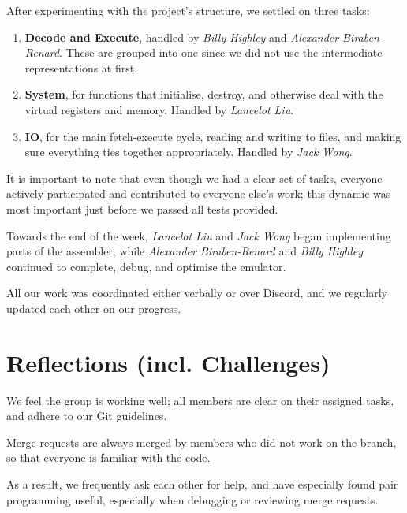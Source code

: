 \documentclass{ictex}
\begin{document}
After experimenting with the project's structure, we settled on three tasks:

\begin{enumerate}
    \item \textbf{Decode and Execute}, handled by \textit{Billy Highley} and \textit{Alexander Biraben-Renard}. These are grouped into one since we did not use the intermediate representations at first.
    \item \textbf{System}, for functions that initialise, destroy, and otherwise deal with the virtual registers and memory. Handled by \textit{Lancelot Liu}.
    \item \textbf{IO}, for the main fetch-execute cycle, reading and writing to files, and making sure everything ties together appropriately. Handled by \textit{Jack Wong}.
\end{enumerate}

\vspace{1em} \begin{formal}
    It is important to note that even though we had a clear set of tasks, everyone actively participated and contributed to everyone else's work; this dynamic was most important just before we passed all tests provided.
\end{formal}

Towards the end of the week, \textit{Lancelot Liu} and \textit{Jack Wong} began implementing parts of the assembler, while \textit{Alexander Biraben-Renard} and \textit{Billy Highley} continued to complete, debug, and optimise the emulator.

All our work was coordinated either verbally or over Discord, and we regularly updated each other on our progress.

\section{Reflections (incl. Challenges)}

We feel the group is working well; all members are clear on their assigned tasks, and adhere to our Git guidelines.

\vspace{1em} \begin{formal}
    Merge requests are always merged by members who did not work on the branch, so that everyone is familiar with the code.
\end{formal}

As a result, we frequently ask each other for help, and have especially found pair programming useful, especially when debugging or reviewing merge requests.
\end{document}
